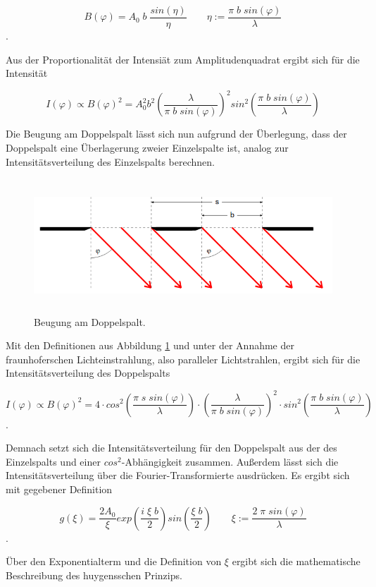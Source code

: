 \begin{equation}
    B (\varphi) = A_0 \; b \; \frac{sin(\eta)}{\eta} \qquad \eta := \frac{\pi \; b \; sin(\varphi)}{\lambda}
    \label{eqn:Amplitude}
\end{equation}.

Aus der Proportionalität der Intensiät zum Amplitudenquadrat ergibt sich für die Intensität

\begin{equation}
    I(\varphi) \propto B(\varphi)^2 = A_0^2 b^2 \left (\frac{\lambda}{\pi \; b \; sin(\varphi)}\right)^2 sin^2 \left(\frac{\pi \; b \; sin(\varphi)}{\lambda}\right)
    \label{eqn:IntEin}
\end{equation}

Die Beugung am Doppelspalt lässt sich nun aufgrund der Überlegung, dass der Doppelspalt eine Überlagerung zweier Einzelspalte ist, analog zur Intensitätsverteilung des Einzelspalts berechnen.

\begin{figure}[H]
    \centering
    \includegraphics[height=5cm]{Theorie/Doppel.png}
    \caption{Beugung am Doppelspalt. \cite{1}}
    \label{fig:Doppel}
\end{figure}

Mit den Definitionen aus Abbildung \ref{fig:Doppel} und unter der Annahme der fraunhoferschen Lichteinstrahlung, also paralleler Lichtstrahlen, ergibt sich für die Intensitätsverteilung des Doppelspalts

\begin{equation}
    I(\varphi) \propto B(\varphi)^2 = 4 \cdot cos^2 \left(\frac{\pi \; s \; sin(\varphi)}{\lambda}\right) \cdot \left(\frac{\lambda}{\pi \; b \; sin(\varphi)}\right)^2 \cdot sin^2 \left(\frac{\pi \; b \; sin(\varphi)}{\lambda}\right)
    \label{eqn:IntDop}
\end{equation}.

Demnach setzt sich die Intensitätsverteilung für den Doppelspalt aus der des Einzelspalts und einer $cos^2$-Abhängigkeit zusammen.
Außerdem lässt sich die Intensitätsverteilung über die Fourier-Transformierte ausdrücken.
Es ergibt sich mit gegebener Definition

\begin{equation}
    g(\xi) = \frac{2 A_0}{\xi} exp\left(\frac{i \; \xi \; b}{2}\right) sin \left(\frac{\xi \; b}{2}\right) \qquad \xi := \frac{2 \; \pi \; sin(\varphi)}{\lambda}
    \label{eqn:Fourier}
\end{equation}.

Über den Exponentialterm und die Definition von $\xi$ ergibt sich die mathematische Beschreibung des huygensschen Prinzips.